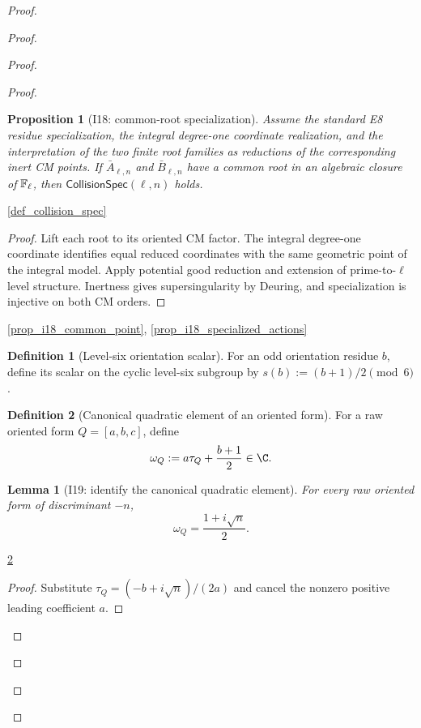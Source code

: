 \documentclass[11pt,a4paper]{article}
\numberwithin{equation}{section}
\theoremstyle{plain}\newtheorem{theorem}{Theorem}[section]\newaliascnt{proposition}{theorem}\newtheorem{proposition}[proposition]{Proposition}\aliascntresetthe{proposition}\newaliascnt{lemma}{theorem}\newtheorem{lemma}[lemma]{Lemma}\aliascntresetthe{lemma}
\theoremstyle{definition}\newaliascnt{definition}{theorem}\newtheorem{definition}[definition]{Definition}\aliascntresetthe{definition}\newaliascnt{notation}{theorem}\newtheorem{notation}[notation]{Notation}\aliascntresetthe{notation}
\providecommand{\lean}[1]{}\providecommand{\leanok}{}
\begin{document}
\begin{proof}
\begin{proof}
\begin{proof}
\begin{proof}
\begin{proposition}[I18: common-root specialization]\label{prop_i18_common_root}\lean{SptCM.CM.Repaired.ActualClassPolynomialSpec.actual_common_root_specialization}\leanok
Assume the standard E8 residue specialization, the integral degree-one
coordinate realization, and the interpretation of the two finite root
families as reductions of the corresponding inert CM points.  If
$\bar A_{\ell,n}$ and $\bar B_{\ell,n}$ have a common root in an algebraic
closure of $\mathbb F_\ell$, then $\mathsf{CollisionSpec}(\ell,n)$ holds.
\end{proposition}
\begin{uses-statement}\ref{def_collision_spec}\end{uses-statement}
\begin{proof}
Lift each root to its oriented CM factor.  The integral degree-one coordinate identifies equal reduced coordinates with the same geometric point of the integral model.  Apply potential good reduction and extension of prime-to-$\ell$ level structure.  Inertness gives supersingularity by Deuring, and specialization is injective on both CM orders.
\end{proof}
\begin{uses-proof}\ref{prop_i18_common_point}, \ref{prop_i18_specialized_actions}\end{uses-proof}

\begin{definition}[Level-six orientation scalar]\label{def_orientation_scalar}\lean{SptCM.Repair.orientationScalar}\leanok
For an odd orientation residue $b$, define its scalar on the cyclic level-six subgroup by $s(b):=(b+1)/2\pmod6$.
\end{definition}

\begin{definition}[Canonical quadratic element of an oriented form]\label{def_i19_raw_omega}\lean{SptCM.Repair.rawOmega}\leanok
For a raw oriented form $Q=[a,b,c]$, define
\[
  \omega_Q:=a\tau_Q+\frac{b+1}{2}\in\C.
\]
\end{definition}

\begin{lemma}[I19: identify the canonical quadratic element]\label{lem_i19_raw_omega_eq}\lean{SptCM.Repair.rawOmega_eq}\leanok
For every raw oriented form of discriminant $-n$,
\[
  \omega_Q=\frac{1+i\sqrt n}{2}.
\]
\end{lemma}
\begin{uses-statement}\ref{def_i19_raw_omega}\end{uses-statement}
\begin{proof}
Substitute $\tau_Q=(-b+i\sqrt n)/(2a)$ and cancel the nonzero positive
leading coefficient $a$.
\end{proof}


\end{proof}
\end{proof}
\end{proof}
\end{proof}
\end{document}
